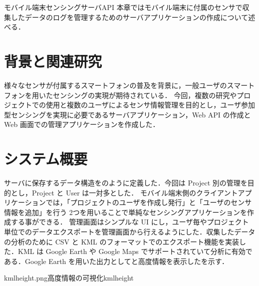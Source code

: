 \chapterhead
{モバイル端末センシングサーバAPI}
{本章ではモバイル端末に付属のセンサで収集したデータのログを管理するためのサーバアプリケーションの作成について述べる．}


\section{背景と関連研究}
様々なセンサが付属するスマートフォンの普及を背景に，一般ユーザのスマートフォンを用いたセンシングの実現が期待されている\cite{usersencing}．
今回，複数の研究やプロジェクトでの使用と複数のユーザによるセンサ情報管理を目的とし，ユーザ参加型センシングを実現に必要であるサーバアプリケーション，Web API の作成と Web 画面での管理アプリケーションを作成した．
\section{システム概要}
サーバに保存するデータ構造をのように定義した．今回は Project 別の管理を目的とし，Project と User は一対多とした．
モバイル端末側のクライアントアプリケーションでは，「プロジェクトのユーザを作成し発行」と「ユーザのセンサ情報を追加」を行う 2つを用いることで単純なセンシングアプリケーションを作成する事ができる．
管理画面はシンプルな UI にし，ユーザ毎やプロジェクト単位でのデータエクスポートを管理画面から行えるようにした．収集したデータの分析のために CSV と KML のフォーマットでのエクスポート機能を実装した．KML は Google Earth や Google Maps でサポートされていて分析に有効である．Google Earth を用いた出力としてと高度情報を表示したを示す．


\vspace{-1cm}

{kmlheight.png}{高度情報の可視化}{kmlheight}


\newpage
